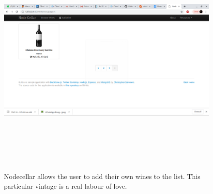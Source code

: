  \begin{figure}[ht!]
\centering
  \includegraphics[width=12cm,height=12cm, keepaspectratio]{chateaudiscoveryservice.png}%
  \caption{Nodecellar allows the user to add their own wines to the list. This particular vintage is a real labour of love.}
  \label{fig:chateau}
\end{figure}
